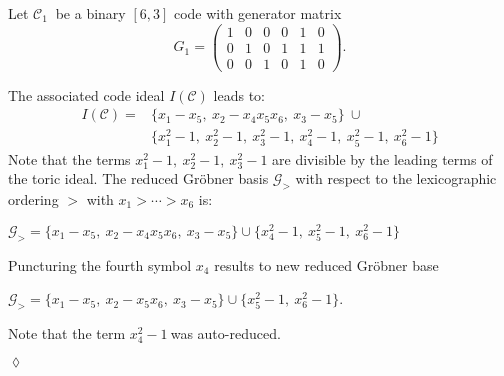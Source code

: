 \begin{env_example} \normalfont
 Let $\mathcal{C}_{1}~$ be a binary $[6,3]$ code with generator matrix
\[
G_{1} =
\begin{pmatrix}
1 & 0 & 0 & 0 & 1 & 0 \\ 
0 & 1 & 0 & 1 & 1 & 1 \\  
0 & 0 & 1 & 0 & 1 & 0  
\end{pmatrix} 
.\]

The associated code ideal $I(\mathcal{C})$ leads to: \newline
\begin{align*}
I(\mathcal{C}) = &\{x_{1}-x_{5},~x_{2}-x_{4}x_{5}x_{6},~x_{3}-x_{5}  \} ~\cup \\ &\{x_{1}^{2}-1,~x_{2}^{2}-1,~x_{3}^{2}-1,~x_{4}^{2}-1,~x_{5}^{2}-1,~x_{6}^{2}-1\}
\end{align*}
Note that the terms $x_{1}^{2}-1,~x_{2}^{2}-1,~x_{3}^{2}-1 $ are divisible by the leading terms of the toric ideal.
The reduced Gröbner basis $\mathcal{G}_{>}$ with respect to the lexicographic ordering $>$ with $x_{1} > \cdots > x_{6}$ is:
\begin{center}
$ \mathcal{G}_{>} = \{x_{1}-x_{5},~x_{2}-x_{4}x_{5}x_{6},~x_{3}-x_{5}  \} \cup \{x_{4}^{2}-1,~x_{5}^{2}-1,~x_{6}^{2}-1  \}  $
\end{center}

Puncturing the fourth symbol $x_4$ results to new reduced Gröbner base 
\begin{center}
$ \mathcal{G}_{>} = \{x_{1}-x_{5},~x_{2}-x_{5}x_{6},~x_{3}-x_{5}  \} \cup \{x_{5}^{2}-1,~x_{6}^{2}-1  \}  $.
\end{center}
Note that the term $x_{4}^{2}-1~$was auto-reduced.


\begin{flushright}
$\lozenge$
\end{flushright} 

\end{env_example}

 

\newpage